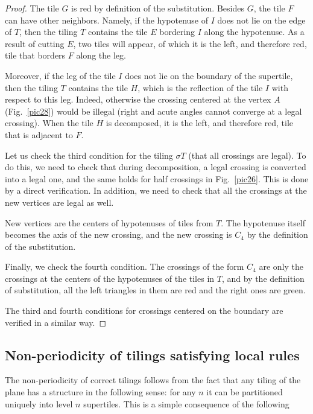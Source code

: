 \documentclass[11pt]{article}
\theoremstyle{remark}
\begin{document}
\begin{proof}
The tile $G$ is red by definition of the substitution.
Besides $G$, the tile $F$ can have other neighbors.
Namely, if the hypotenuse of $I$ does not lie on the edge of $T$, then the tiling $T$ contains the tile $E$ bordering $I$ along the hypotenuse.
As a result of cutting $E$, two tiles will appear, of which it is the left, and therefore red, tile that borders $F$ along the leg.

Moreover, if the leg of the tile $I$ does not lie on the boundary of the supertile, then the tiling $T$ contains the tile $H$,
which is the reflection of the tile $I$ with respect to this leg.
Indeed, otherwise the crossing centered at the vertex $A$ (Fig.~\ref{pic28}) would be illegal
(right and acute angles cannot converge at a legal crossing).
When the tile $H$ is decomposed, it is the left, and therefore red, tile that is adjacent to $F$.

Let us check the third condition for the tiling $\sigma T$ (that all crossings are legal).
To do this, we need to check that during decomposition, a legal crossing is converted into a legal one,
and the same holds for half crossings in Fig.~\ref{pic26}.
This is done by a direct verification.
In addition, we need to check that all the crossings at the new vertices are legal as well.

New vertices are the centers of  hypotenuses of tiles from $T$.
The hypotenuse itself becomes the axis of the new crossing, and the new crossing is $C_4$ by the definition of the substitution.

 
Finally, we check the fourth condition. The crossings of the form $C_4$ are only the crossings at the centers of the hypotenuses of the tiles in $T$,
and by the definition of substitution, all the left triangles in them are red and the right ones are green.

The third and fourth conditions for crossings centered on the boundary are verified in a similar way.
\end{proof}

\subsection{Non-periodicity of tilings satisfying local rules}

The non-periodicity of correct tilings follows from the fact that any
tiling of the plane has a structure in the following sense:
for any $n$ it can be partitioned uniquely into level $n$ supertiles.
This is a simple consequence of the following 
\end{document}
